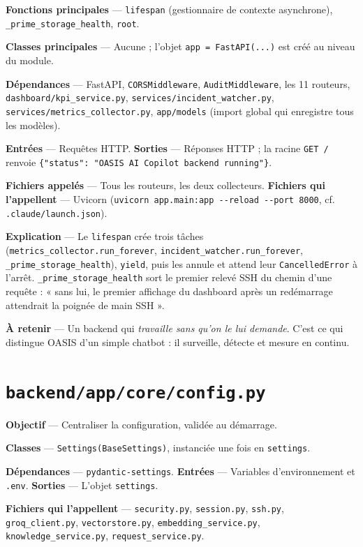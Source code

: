 \documentclass[11pt,a4paper]{report}
\newcommand{\file}[1]{\texttt{\small #1}}
\newcommand{\fn}[1]{\texttt{\small\textcolor{oasisviolet}{#1}}}
\newcommand{\cls}[1]{\texttt{\small\textcolor{oasisblue}{#1}}}
\newcommand{\route}[1]{\texttt{\small\textcolor{oasisgreen}{#1}}}
\begin{document}
\textbf{Fonctions principales} --- \fn{lifespan} (gestionnaire de contexte
asynchrone), \fn{\_prime\_storage\_health}, \fn{root}.

\textbf{Classes principales} --- Aucune ; l'objet \texttt{app = FastAPI(...)} est
créé au niveau du module.

\textbf{Dépendances} --- FastAPI, \cls{CORSMiddleware}, \cls{AuditMiddleware},
les 11 routeurs, \file{dashboard/kpi\_service.py},
\file{services/incident\_watcher.py}, \file{services/metrics\_collector.py},
\file{app/models} (import global qui enregistre tous les modèles).

\textbf{Entrées} --- Requêtes HTTP. \textbf{Sorties} --- Réponses HTTP ; la
racine \route{GET /} renvoie \texttt{\{"status": "OASIS AI Copilot backend
running"\}}.

\textbf{Fichiers appelés} --- Tous les routeurs, les deux collecteurs.
\textbf{Fichiers qui l'appellent} --- Uvicorn
(\texttt{uvicorn app.main:app -{}-reload -{}-port 8000}, cf.
\file{.claude/launch.json}).

\textbf{Explication} --- Le \fn{lifespan} crée trois tâches
(\fn{metrics\_collector.run\_forever}, \fn{incident\_watcher.run\_forever},
\fn{\_prime\_storage\_health}), \texttt{yield}, puis les annule et attend leur
\cls{CancelledError} à l'arrêt. \fn{\_prime\_storage\_health} sort le premier
relevé SSH du chemin d'une requête : « sans lui, le premier affichage du
dashboard après un redémarrage attendrait la poignée de main SSH ».

\textbf{À retenir} --- Un backend qui \emph{travaille sans qu'on le lui
demande}. C'est ce qui distingue OASIS d'un simple chatbot : il surveille,
détecte et mesure en continu.

\section{\file{backend/app/core/config.py}}

\textbf{Objectif} --- Centraliser la configuration, validée au démarrage.

\textbf{Classes} --- \cls{Settings(BaseSettings)}, instanciée une fois en
\fn{settings}.

\textbf{Dépendances} --- \texttt{pydantic-settings}.
\textbf{Entrées} --- Variables d'environnement et \file{.env}.
\textbf{Sorties} --- L'objet \fn{settings}.

\textbf{Fichiers qui l'appellent} --- \file{security.py}, \file{session.py},
\file{ssh.py}, \file{groq\_client.py}, \file{vectorstore.py},
\file{embedding\_service.py}, \file{knowledge\_service.py},
\file{request\_service.py}.
\end{document}
